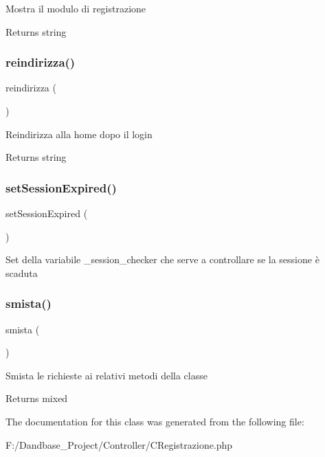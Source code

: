 Mostra il modulo di registrazione

\begin{DoxyReturn}{Returns}
string 
\end{DoxyReturn}
\mbox{\label{class_c_registrazione_a29bdc8fd7986f73f25db00b8461b1555}} 
\subsubsection{\texorpdfstring{reindirizza()}{reindirizza()}}
{\footnotesize\ttfamily reindirizza (\begin{DoxyParamCaption}{ }\end{DoxyParamCaption})}

Reindirizza alla home dopo il login

\begin{DoxyReturn}{Returns}
string 
\end{DoxyReturn}
\mbox{\label{class_c_registrazione_aee0ceb27c20213e8f77ae843cd1c0176}} 
\subsubsection{\texorpdfstring{set\+Session\+Expired()}{setSessionExpired()}}
{\footnotesize\ttfamily set\+Session\+Expired (\begin{DoxyParamCaption}{ }\end{DoxyParamCaption})}

Set della variabile \+\_\+session\+\_\+checker che serve a controllare se la sessione è scaduta \mbox{\label{class_c_registrazione_afc7ba180569cef3535974cfc4a1211f1}} 
\subsubsection{\texorpdfstring{smista()}{smista()}}
{\footnotesize\ttfamily smista (\begin{DoxyParamCaption}{ }\end{DoxyParamCaption})}

Smista le richieste ai relativi metodi della classe

\begin{DoxyReturn}{Returns}
mixed 
\end{DoxyReturn}


The documentation for this class was generated from the following file\+:\begin{DoxyCompactItemize}
\item 
F\+:/\+Dandbase\+\_\+\+Project/\+Controller/C\+Registrazione.\+php\end{DoxyCompactItemize}
